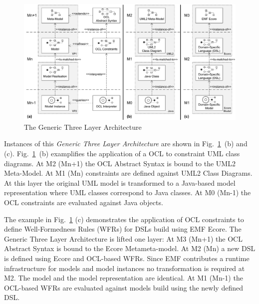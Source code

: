 	\begin{figure}[t]
			\centering
				\includegraphics[width=1.00\textwidth]{figures/genericlayers.pdf}
			\caption{The Generic Three Layer Architecture}
			\label{fig:genericlayers}
		\end{figure}


Instances of this \emph{Generic Three Layer Architecture} are shown in
Fig.~\ref{fig:genericlayers}~(b) and (c). Fig.~\ref{fig:genericlayers}~(b)
examplifies the application of a OCL to constraint UML class diagrams. At M2 (Mn+1) 
the OCL Abstract Syntax is bound to the UML2 Meta-Model. At M1 (Mn) constraints are defined against UML2
Class Diagrams. At this layer the original UML model is transformed to a
Java-based model representation where UML classes correspond to Java classes.
At M0 (Mn-1) the OCL constraints are evaluated against Java
objects.

The example in Fig.~\ref{fig:genericlayers} (c) demonstrates the
application of OCL constraints to define Well-Formedness Rules (WFRs) for
DSLs build using EMF Ecore. The Generic Three Layer Architecture is lifted one
layer: At M3 (Mn+1) the OCL Abstract Syntax is bound to the Ecore
Metameta-model. At M2 (Mn) a new DSL is defined using Ecore and OCL-based WFRs. 
Since EMF contributes a runtime infrastructure for models
and model instances no transformation is required at M2. The model and the
model representation are identical. At M1 (Mn-1) the OCL-based WFRs are
evaluated against models build using the newly defined DSL.

